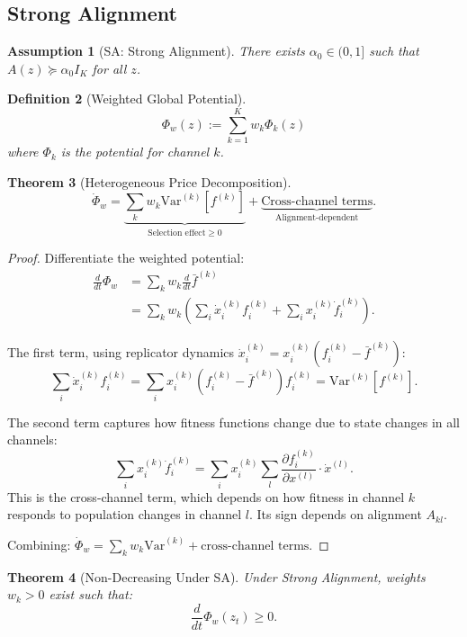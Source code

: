 \documentclass[12pt]{article}
\newtheorem{theorem}{Theorem}[section]
\newtheorem{definition}[theorem]{Definition}
\newtheorem{assumption}[theorem]{Assumption}
\newcommand{\Var}{\mathrm{Var}}
\begin{document}
\subsection{Strong Alignment}

\begin{assumption}[SA: Strong Alignment]
\label{ass:sa}
There exists $\alpha_0 \in (0, 1]$ such that $A(z) \succeq \alpha_0 I_K$ for all $z$.
\end{assumption}

\begin{definition}[Weighted Global Potential]
\[
\Phi_w(z) := \sum_{k=1}^K w_k \Phi_k(z)
\]
where $\Phi_k$ is the potential for channel $k$.
\end{definition}

\begin{theorem}[Heterogeneous Price Decomposition]
\label{thm:hetero-price}
\[
\dot{\Phi}_w = \underbrace{\sum_k w_k \Var^{(k)}[f^{(k)}]}_{\text{Selection effect} \geq 0} + \underbrace{\text{Cross-channel terms}}_{\text{Alignment-dependent}}.
\]
\end{theorem}

\begin{proof}
Differentiate the weighted potential:
\begin{align*}
\frac{d}{dt} \Phi_w &= \sum_k w_k \frac{d}{dt} \bar{f}^{(k)} \\
&= \sum_k w_k \left( \sum_i \dot{x}_i^{(k)} f_i^{(k)} + \sum_i x_i^{(k)} \dot{f}_i^{(k)} \right).
\end{align*}

The first term, using replicator dynamics $\dot{x}_i^{(k)} = x_i^{(k)}(f_i^{(k)} - \bar{f}^{(k)})$:
\[
\sum_i \dot{x}_i^{(k)} f_i^{(k)} = \sum_i x_i^{(k)}(f_i^{(k)} - \bar{f}^{(k)}) f_i^{(k)} = \Var^{(k)}[f^{(k)}].
\]

The second term captures how fitness functions change due to state changes in all channels:
\[
\sum_i x_i^{(k)} \dot{f}_i^{(k)} = \sum_i x_i^{(k)} \sum_l \frac{\partial f_i^{(k)}}{\partial x^{(l)}} \cdot \dot{x}^{(l)}.
\]
This is the cross-channel term, which depends on how fitness in channel $k$ responds to population changes in channel $l$. Its sign depends on alignment $A_{kl}$.

Combining: $\dot{\Phi}_w = \sum_k w_k \Var^{(k)} + \text{cross-channel terms}$.
\end{proof}

\begin{theorem}[Non-Decreasing Under SA]
\label{thm:sa-lyapunov}
Under Strong Alignment, weights $w_k > 0$ exist such that:
\[
\frac{d}{dt} \Phi_w(z_t) \geq 0.
\]
\end{theorem}
\end{document}
